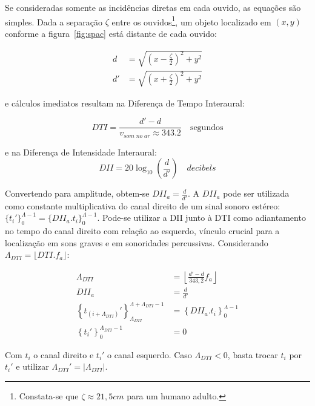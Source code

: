 	Se consideradas somente as incidências diretas em cada ouvido, as equações são simples. Dada a separação $\zeta$ entre os ouvidos\footnote{Constata-se que $\zeta \approx 21,5cm$ para um humano adulto.},
um objeto localizado em $(x,y)$ conforme a figura~\ref{fig:spac}
está distante de cada ouvido:

\begin{equation}\label{eq:distOuvidos}
\begin{split}
d & =\sqrt{\left (x-\frac{\zeta}{2} \right )^2+y^2} \\
d' & =\sqrt{\left (x+\frac{\zeta}{2} \right )^2 + y^2}
\end{split}
\end{equation}


e cálculos imediatos resultam na Diferença de Tempo Interaural:

\begin{equation}\label{eq:dti}
DTI=\frac{d'-d}{v_{som\;no\;ar}\approx 343.2 }\quad \text{segundos}
\end{equation}

e na Diferença de Intensidade Interaural:
\begin{equation}\label{eq:dii}
DII=20\log_{10}\left (\frac{d}{d'}\right) \quad decibels
\end{equation}

Convertendo para amplitude, obtem-se $DII_a=\frac{d}{d'}$. A $DII_a$ pode
ser utilizada como constante multiplicativa do canal direito de um sinal sonoro estéreo: $\{t_i'\}_0^{\Lambda -1}=\{DII_a . t_i\}_0^{\Lambda -1}$. Pode-se utilizar a DII junto à DTI como adiantamento no tempo do canal direito com relação ao esquerdo, vínculo crucial para a localização em sons graves e em sonoridades percussivas.\cite{Heeger}  
Considerando $\Lambda_{DTI}=\lfloor DTI . f_a \rfloor$:

\begin{equation}\label{eq:locImpl}
\begin{split}
\Lambda_{DTI} & = \left \lfloor \frac{d'-d}{343,2}  f_a \right \rfloor \\
DII_a & = \frac{d}{d'} \\
\left\{t_{(i+\Lambda_{DTI})}'\right\}_{\Lambda_{DTI}}^{\Lambda+\Lambda_{DTI}-1} & =\left\{DII_a . t_i\right\}_0^{\Lambda-1} \\
\left\{t_i'\right\}_0^{\Lambda_{DTI}-1} & = 0
\end{split}
\end{equation}

Com $t_i$ o canal direito e $t_i'$ o canal esquerdo. Caso $\Lambda_{DTI} < 0 $, basta trocar $t_i$ por $t_i'$  e utilizar $\Lambda_{DTI}'= | \Lambda_{DTI} | $.

